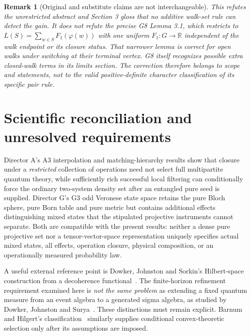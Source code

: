 \documentclass[11pt]{article}
\newtheorem{remark}[theorem]{Remark}
\begin{document}
\begin{remark}[Original and substitute claims are not interchangeable]
This refutes the unrestricted abstract and Section 3 gloss that \emph{no} additive walk-set rule can detect the gain. It does \emph{not} refute the precise G8 Lemma 3.1, which restricts to $L(S)=\sum_{w\in S}F_1(\varphi(w))$ with one uniform $F_1:G\to\mathbb R$ independent of the walk endpoint or its closure status. That narrower lemma is correct for open walks under switching at their terminal vertex. G8 itself recognizes possible extra closed-walk terms in its limits section. The correction therefore belongs to scope and statements, not to the valid positive-definite character classification of its specific pair rule.
\end{remark}

\section{Scientific reconciliation and unresolved requirements}
Director A's A3 interpolation and matching-hierarchy results show that closure under a \emph{restricted} collection of operations need not select full multipartite quantum theory, while sufficiently rich successful local filtering can conditionally force the ordinary two-system density set after an entangled pure seed is supplied. Director G's G3 odd Veronese state space retains the pure Bloch sphere, pure Born table and pure metric but contains additional effects distinguishing mixed states that the stipulated projective instruments cannot separate. Both are compatible with the present results: neither a dense pure projective set nor a tensor-vector-space representation uniquely specifies actual mixed states, all effects, operation closure, physical composition, or an operationally measured probability law.

A useful external reference point is Dowker, Johnston and Sorkin's Hilbert-space construction from a decoherence functional~\cite{DJS2010}. The finite-horizon refinement requirement examined here is \emph{not the same problem} as extending a fixed quantum measure from an event algebra to a generated sigma algebra, as studied by Dowker, Johnston and Surya~\cite{DJS2010b}. These distinctions must remain explicit. Barnum and Hilgert's classification~\cite{BH2020} similarly supplies conditional convex-theoretic selection only after its assumptions are imposed.
\end{document}
